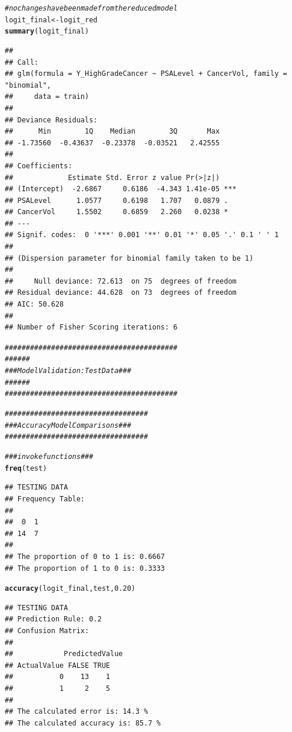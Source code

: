 \documentclass{article}\usepackage[]{graphicx}\usepackage[]{color}
\makeatletter
\newcommand{\hlnum}[1]{\textcolor[rgb]{0.686,0.059,0.569}{#1}}%
\newcommand{\hlcom}[1]{\textcolor[rgb]{0.678,0.584,0.686}{\textit{#1}}}%
\newcommand{\hlstd}[1]{\textcolor[rgb]{0.345,0.345,0.345}{#1}}%
\newcommand{\hlkwb}[1]{\textcolor[rgb]{0.69,0.353,0.396}{#1}}%
\newcommand{\hlkwd}[1]{\textcolor[rgb]{0.737,0.353,0.396}{\textbf{#1}}}%
\newenvironment{kframe}{%
 \def\at@end@of@kframe{}%
 \ifinner\ifhmode%
  \def\at@end@of@kframe{\end{minipage}}%
  \begin{minipage}{\columnwidth}%
 \fi\fi%
 \def\FrameCommand##1{\hskip\@totalleftmargin \hskip-\fboxsep
 \colorbox{shadecolor}{##1}\hskip-\fboxsep
     \hskip-\linewidth \hskip-\@totalleftmargin \hskip\columnwidth}%
 \MakeFramed {\advance\hsize-\width
   \@totalleftmargin\z@ \linewidth\hsize
   \@setminipage}}%
 {\par\unskip\endMakeFramed%
 \at@end@of@kframe}
\newenvironment{knitrout}{}{} %
\makeatother
\begin{document}
\begin{knitrout}
\begin{kframe}
\begin{alltt}
\hlcom{# no changes have been made from the reduced model}
\hlstd{logit_final} \hlkwb{<-} \hlstd{logit_red}
\hlkwd{summary}\hlstd{(logit_final)}
\end{alltt}
\begin{verbatim}
## 
## Call:
## glm(formula = Y_HighGradeCancer ~ PSALevel + CancerVol, family = "binomial", 
##     data = train)
## 
## Deviance Residuals: 
##      Min        1Q    Median        3Q       Max  
## -1.73560  -0.43637  -0.23378  -0.03521   2.42555  
## 
## Coefficients:
##             Estimate Std. Error z value Pr(>|z|)    
## (Intercept)  -2.6867     0.6186  -4.343 1.41e-05 ***
## PSALevel      1.0577     0.6198   1.707   0.0879 .  
## CancerVol     1.5502     0.6859   2.260   0.0238 *  
## ---
## Signif. codes:  0 '***' 0.001 '**' 0.01 '*' 0.05 '.' 0.1 ' ' 1
## 
## (Dispersion parameter for binomial family taken to be 1)
## 
##     Null deviance: 72.613  on 75  degrees of freedom
## Residual deviance: 44.628  on 73  degrees of freedom
## AIC: 50.628
## 
## Number of Fisher Scoring iterations: 6
\end{verbatim}
\begin{alltt}
\hlcom{#########################################}
\hlcom{###                                   ###}
\hlcom{###    Model Validation: Test Data    ###}
\hlcom{###                                   ###}
\hlcom{#########################################}

\hlcom{##################################}
\hlcom{### Accuracy Model Comparisons ###}
\hlcom{##################################}

\hlcom{### invoke functions ###}
\hlkwd{freq}\hlstd{(test)}
\end{alltt}
\begin{verbatim}
## TESTING DATA
## Frequency Table:
## 
##  0  1 
## 14  7 
## 
## The proportion of 0 to 1 is: 0.6667 
## The proportion of 1 to 0 is: 0.3333
\end{verbatim}
\begin{alltt}
\hlkwd{accuracy}\hlstd{(logit_final, test,} \hlnum{0.20}\hlstd{)}
\end{alltt}
\begin{verbatim}
## TESTING DATA
## Prediction Rule: 0.2 
## Confusion Matrix:
##  
##            PredictedValue
## ActualValue FALSE TRUE
##           0    13    1
##           1     2    5
## 
## The calculated error is: 14.3 %
## The calculated accuracy is: 85.7 %
\end{verbatim}
\end{kframe}
\end{knitrout}
\end{document}
